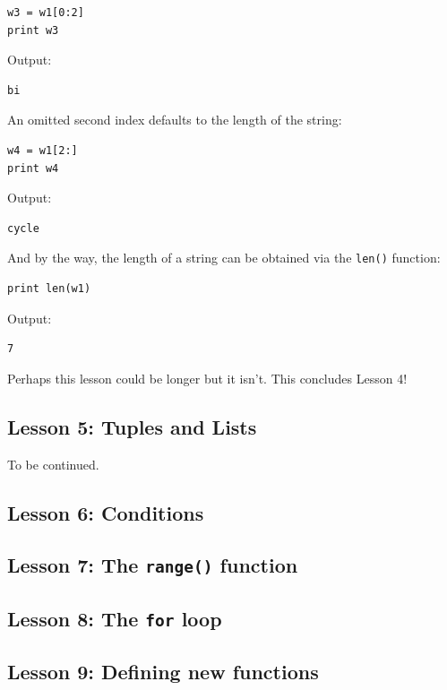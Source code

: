 \documentclass[article,A4,12pt]{llncs}
\begin{document}
\begin{verbatim}
w3 = w1[0:2]
print w3
\end{verbatim}
Output:

\begin{verbatim}
bi
\end{verbatim}
An omitted second index defaults to the length of the string:

\begin{verbatim}
w4 = w1[2:]
print w4
\end{verbatim}
Output:

\begin{verbatim}
cycle
\end{verbatim}
And by the way, the length of a string can be obtained via the {\tt len()} function:

\begin{verbatim}
print len(w1)
\end{verbatim}
Output:

\begin{verbatim}
7
\end{verbatim}
Perhaps this lesson could be longer but it isn't. This concludes Lesson 4!


\subsection{Lesson 5: Tuples and Lists}

To be continued.

\subsection{Lesson 6: Conditions}



\subsection{Lesson 7: The {\tt range()} function}







\subsection{Lesson 8: The {\tt for} loop}



\subsection{Lesson 9: Defining new functions}
\end{document}
